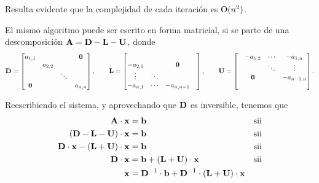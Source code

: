 Resulta evidente que la complejidad de cada iteración es $\mathrm{O}(n^2)$.

El mismo algoritmo puede ser escrito en forma matricial, si se parte de una
descomposición $\mathbf{A} = \mathbf{D} - \mathbf{L} - \mathbf{U}$, donde
\[ \mathbf{D} = \begin{bmatrix}
    a_{1,1} &         &         & \mathbf{0} \\
            & a_{2,2} &         &         \\
            &         & \ddots  &         \\
    \mathbf{0} &         &         & a_{n,n} \\
\end{bmatrix}, \hspace{.7cm}
\mathbf{L} = \begin{bmatrix}
             &         &            &         \\
    -a_{2,1} &         & \mathbf{0}    &         \\
    \vdots   & \ddots  &            &         \\
    -a_{n,1} & \cdots  & -a_{n,n-1} &         \\
\end{bmatrix}, \hspace{.7cm}
\mathbf{U} = \begin{bmatrix}
            & -a_{1,2} & \cdots  & -a_{1,n}   \\
            &          & \ddots  & \vdots     \\
            & \mathbf{0}  &         & -a_{n-1,n} \\
            &          &         &            \\
\end{bmatrix}. \]

Reescribiendo el sistema, y aprovechando que $\mathbf{D}$ es inversible, tenemos
que
\[ \begin{aligned}
    \mathbf{A} \cdot \mathbf{x} &= \mathbf{b}
        & \text{sii} \\
    (\mathbf{D} - \mathbf{L} - \mathbf{U}) \cdot \mathbf{x} &= \mathbf{b}
        & \text{sii} \\
    \mathbf{D} \cdot \mathbf{x} - (\mathbf{L} + \mathbf{U}) \cdot \mathbf{x} &= \mathbf{b}
        & \text{sii} \\
    \mathbf{D} \cdot \mathbf{x} &= \mathbf{b} + (\mathbf{L} + \mathbf{U}) \cdot \mathbf{x}
        & \text{sii} \\
    \mathbf{x} &= \mathbf{D}^{-1} \cdot \mathbf{b}
        + \mathbf{D}^{-1} \cdot (\mathbf{L} + \mathbf{U}) \cdot \mathbf{x}
\end{aligned} \]


